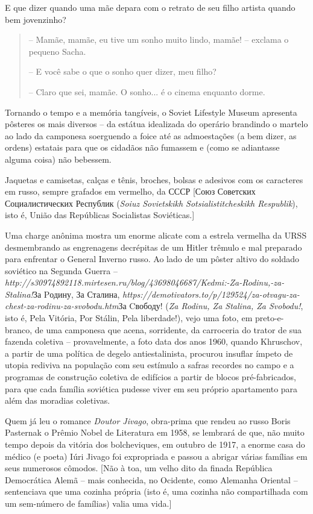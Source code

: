 E que dizer quando uma mãe depara com o retrato de seu filho artista
quando bem jovenzinho?

\begin{quote}
-- Mamãe, mamãe, eu tive um sonho muito lindo, mamãe! -- exclama o
pequeno Sacha.

-- E você sabe o que o sonho quer dizer, meu filho?

-- Claro que sei, mamãe. O sonho... é o cinema enquanto dorme.
\end{quote}

Tornando o tempo e a memória tangíveis, o Soviet Lifestyle Museum
apresenta pôsteres os mais diversos -- da estátua idealizada do operário
brandindo o martelo ao lado da camponesa soerguendo a foice até as
admoestações (a bem dizer, as ordens) estatais para que os cidadãos não
fumassem e (como se adiantasse alguma coisa) não bebessem.

Jaquetas e camisetas, calças e tênis, broches, bolsas e adesivos com os
caracteres em russo, sempre grafados em vermelho, da СССР {[}Союз
Советских Социалистических Республик (\emph{Soiuz Sovietskikh
Sotsialistitcheskikh Respublik}), isto é, União das Repúblicas
Socialistas Soviéticas.{]}

Uma charge anônima mostra um enorme alicate com a estrela vermelha da
URSS desmembrando as engrenagens decrépitas de um Hitler trêmulo e mal
preparado para enfrentar o General Inverno russo. Ao lado de um pôster
altivo do soldado soviético na Segunda Guerra --
\emph{http://s30974892118.mirtesen.ru/blog/43698046687/Kedmi:-Za-Rodinu,-za-Stalina!}{За
Pодину, За Сталина},
\emph{https://demotivators.to/p/129524/za-otvagu-za-chest-za-rodinu-za-svobodu.htm}{За
Cвободу}! (\emph{Za Rodinu, Za Stalina, Za Svobodu!}, isto é, Pela
Vitória, Por Stálin, Pela liberdade!), vejo uma foto, em preto-e-branco,
de uma camponesa que acena, sorridente, da carroceria do trator de sua
fazenda coletiva -- provavelmente, a foto data dos anos 1960, quando
Khruschov, a partir de uma política de degelo antiestalinista, procurou
insuflar ímpeto de utopia rediviva na população com seu estímulo a
safras recordes no campo e a programas de construção coletiva de
edifícios a partir de blocos pré-fabricados, para que cada família
soviética pudesse viver em seu próprio apartamento para além das
moradias coletivas.

Quem já leu o romance \emph{Doutor Jivago}, obra-prima que rendeu ao
russo Boris Pasternak o Prêmio Nobel de Literatura em 1958, se lembrará
de que, não muito tempo depois da vitória dos bolcheviques, em outubro
de 1917, a enorme casa do médico (e poeta) Iúri Jivago foi expropriada e
passou a abrigar várias famílias em seus numerosos cômodos. {[}Não à
toa, um velho dito da finada República Democrática Alemã -- mais
conhecida, no Ocidente, como Alemanha Oriental -- sentenciava que uma
cozinha própria (isto é, uma cozinha não compartilhada com um sem-número
de famílias) valia uma vida.{]}

